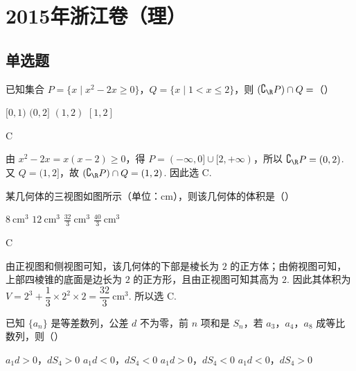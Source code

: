 \chapter{2015年浙江卷（理）}

\section{单选题}

\begin{problem}
已知集合 \(P = \{x \mid x^2 - 2x \geqslant 0\}\)，\(Q = \{x \mid 1 < x \leqslant 2\}\)，则 \((\complement_{\R} P) \cap Q =\)（\quad）

\choices
    {\([0,1)\)}
    {\((0,2]\)}
    {\((1,2)\)}
    {\([1,2]\)}
\end{problem}

\begin{answer}
C
\end{answer}

\begin{solution}
由 \(x^2-2x=x(x-2)\geqslant0\)，得 \(P=(-\infty,0]\cup[2,+\infty)\)，所以
\(\complement_{\R}P=(0,2)\). 又 \(Q=(1,2]\)，故
\((\complement_{\R}P)\cap Q=(1,2)\). 因此选 C.
\end{solution}

\begin{problem}
某几何体的三视图如图所示（单位：\(\mathrm{cm}\)），则该几何体的体积是（\quad）


\choices
    {\(8\mathrm{~cm}^{3}\)}
    {\(12\mathrm{~cm}^{3}\)}
    {\(\frac{32}{3}\mathrm{~cm}^{3}\)}
    {\(\frac{40}{3}\mathrm{~cm}^{3}\)}
\end{problem}

\begin{answer}
C
\end{answer}

\begin{solution}
由正视图和侧视图可知，该几何体的下部是棱长为 \(2\) 的正方体；由俯视图可知，上部四棱锥的底面是边长为 \(2\) 的正方形，且由正视图可知其高为 \(2\). 因此其体积为
\(V=2^3+\dfrac{1}{3}\times2^2\times2=\dfrac{32}{3}\mathrm{~cm}^3\). 所以选 C.
\end{solution}

\begin{problem}
已知 \(\{a_n\}\) 是等差数列，公差 \(d\) 不为零，前 \(n\) 项和是 \(S_n\)，若 \(a_3\)，\(a_4\)，\(a_8\) 成等比数列，则（\quad）

\choices
    {\(a_{1}d > 0\)，\(dS_{4} > 0\)}
    {\(a_{1}d < 0\)，\(dS_{4} < 0\)}
    {\(a_{1}d > 0\)，\(dS_{4} < 0\)}
    {\(a_{1}d < 0\)，\(dS_{4} > 0\)}
\end{problem}

